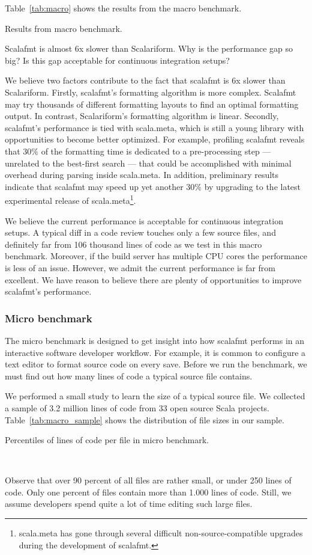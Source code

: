 Table~\ref{tab:macro} shows the results from the macro benchmark.
\begin{table}
  \centering
  \caption{Results from macro benchmark.}\label{tab:macro}
  
\end{table}
Scalafmt is almost 6x slower than Scalariform.
Why is the performance gap so big?
Is this gap acceptable for continuous integration setups?

We believe two factors contribute to the fact that scalafmt is 6x slower than Scalariform.
Firstly, scalafmt's formatting algorithm is more complex.
Scalafmt may try thousands of different formatting layouts to find an optimal formatting output.
In contrast, Scalariform's formatting algorithm is linear.
Secondly, scalafmt's performance is tied with scala.meta, which is still a young library with opportunities to become better optimized.
For example, profiling scalafmt reveals that 30\% of the formatting time is dedicated to a pre-processing step --- unrelated to the best-first search --- that could be accomplished with minimal overhead during parsing inside scala.meta.
In addition, preliminary results indicate that scalafmt may speed up yet another 30\% by upgrading to the latest experimental release of scala.meta\footnote{
scala.meta has gone through several difficult non-source-compatible upgrades during the development of scalafmt.}.

We believe the current performance is acceptable for continuous integration setups.
A typical diff in a code review touches only a few source files, and definitely far from 106 thousand lines of code as we test in this macro benchmark.
Moreover, if the build server has multiple CPU cores the performance is less of an issue.
However, we admit the current performance is far from excellent.
We have reason to believe there are plenty of opportunities to improve scalafmt's performance.

\subsubsection{Micro benchmark}
The micro benchmark is designed to get insight into how scalafmt performs in an interactive software developer workflow.
For example, it is common to configure a text editor to format source code on every save.
Before we run the benchmark, we must find out how many lines of code a typical source file contains.

We performed a small study to learn the size of a typical source file.
We collected a sample of 3.2 million lines of code from 33 open source Scala projects.
Table~\ref{tab:macro_sample} shows the distribution of file sizes in our sample.
\begin{table}
  \centering
  \caption{Percentiles of lines of code per file in micro benchmark.}~\label{tab:macro_sample}
  
\end{table}
Observe that over 90 percent of all files are rather small, or under 250 lines of code.
Only one percent of files contain more than 1.000 lines of code.
Still, we assume developers spend quite a lot of time editing such large files.

